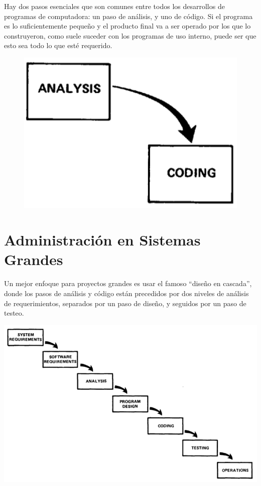 \documentclass{beamer}
\begin{document}
\begin{frame}[fragile]
Hay dos pasos esenciales que son comunes entre todos los desarrollos de programas de computadora: un paso de análisis, y uno de código. Si el programa es lo suficientemente pequeño y el producto final va a ser operado por los que lo construyeron, como suele suceder con los programas de uso interno, puede ser que esto sea todo lo que esté requerido.

\begin{figure}[h]
\includegraphics[width=.3\textwidth]{figures/small.png}
\end{figure}

\vspace{-1em}


\end{frame}

\setcounter{figure}{1}

\section{Administración en Sistemas Grandes}

\begin{frame}[fragile]
Un mejor enfoque para proyectos grandes es usar el famoso ``diseño en cascada'', donde los pasos de análisis y código están precedidos por dos niveles de análisis de requerimientos, separados por un paso de diseño, y seguidos por un paso de testeo.

\begin{center}
\includegraphics[height=.7\textheight]{figures/large.png}
\end{center}

\end{frame}
\end{document}
